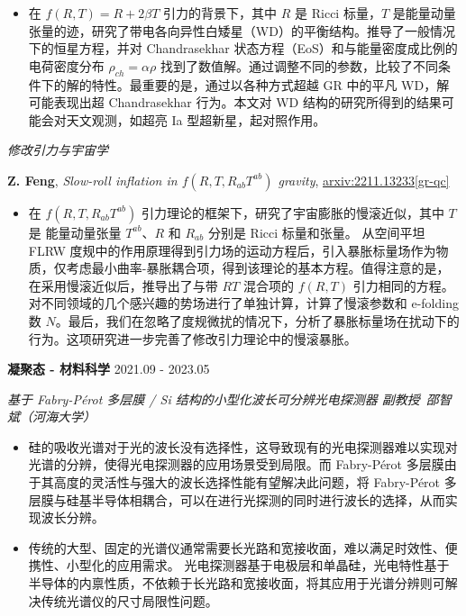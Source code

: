 \documentclass[12pt]{article}
\begin{document}
\begin{itemize}[noitemsep,nolistsep]
    \item 在 $f\left(R, T\right) = R + 2 \beta T$ 引力的背景下，其中 $R$ 是 Ricci 标量，$T$ 是能量动量张量的迹，研究了带电各向异性白矮星（WD）的平衡结构。推导了一般情况下的恒星方程，并对 Chandrasekhar 状态方程（EoS）和与能量密度成比例的电荷密度分布 $\rho_{ch} = \alpha \rho$ 找到了数值解。通过调整不同的参数，比较了不同条件下的解的特性。最重要的是，通过以各种方式超越 GR 中的平凡 WD，解可能表现出超 Chandrasekhar 行为。本文对 WD 结构的研究所得到的结果可能会对天文观测，如超亮 Ia 型超新星，起对照作用。
\end{itemize}

\smallskip \quad \textit{修改引力与宇宙学}

\textbf{Z. Feng}, \textit{Slow-roll inflation in $f\left(R, T, R_{ab}T^{ab}\right)$ gravity}, \href{https://arxiv.org/abs/2211.13233}{arxiv:2211.13233[gr-qc]}

\begin{itemize}[noitemsep,nolistsep]
    \item 在 $f\left(R, T, R_{ab}T^{ab}\right)$ 引力理论的框架下，研究了宇宙膨胀的慢滚近似，其中 $T$ 是 能量动量张量 $T^{ab}$、$R$ 和 $R_{ab}$ 分别是 Ricci 标量和张量。 从空间平坦 FLRW 度规中的作用原理得到引力场的运动方程后，引入暴胀标量场作为物质，仅考虑最小曲率-暴胀耦合项，得到该理论的基本方程。值得注意的是，在采用慢滚近似后，推导出了与带 $RT$ 混合项的 $f(R, T)$ 引力相同的方程。对不同领域的几个感兴趣的势场进行了单独计算，计算了慢滚参数和 e-folding 数 $N$。最后，我们在忽略了度规微扰的情况下，分析了暴胀标量场在扰动下的行为。这项研究进一步完善了修改引力理论中的慢滚暴胀。
\end{itemize}

\medskip \textbf{凝聚态 - 材料科学} \hfill 2021.09 - 2023.05

\smallskip \quad \textit{基于 Fabry-P\'{e}rot 多层膜 / Si 结构的小型化波长可分辨光电探测器 \hfill 副教授\ 邵智斌（河海大学）}

\begin{itemize}[noitemsep,nolistsep]
    \item 硅的吸收光谱对于光的波长没有选择性，这导致现有的光电探测器难以实现对光谱的分辨，使得光电探测器的应用场景受到局限。而 Fabry-P\'{e}rot 多层膜由于其高度的灵活性与强大的波长选择性能有望解决此问题，将 Fabry-P\'{e}rot 多层膜与硅基半导体相耦合，可以在进行光探测的同时进行波长的选择，从而实现波长分辨。
    \item 传统的大型、固定的光谱仪通常需要长光路和宽接收面，难以满足时效性、便携性、小型化的应用需求。 光电探测器基于电极层和单晶硅，光电特性基于半导体的内禀性质，不依赖于长光路和宽接收面，将其应用于光谱分辨则可解决传统光谱仪的尺寸局限性问题。
\end{itemize}
\end{document}
